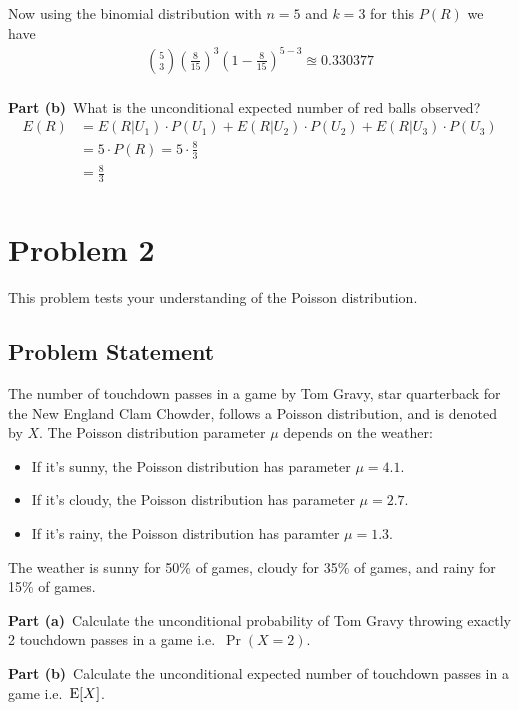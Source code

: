 \documentclass[12pt]{article}
\theoremstyle{definition}
\begin{document}
Now using the binomial distribution with $n=5$ and $k=3$ for this $P(R)$ we have
\begin{align*}
\binom{5}{3}\left(\frac{8}{15}\right)^3 \left(1-\frac{8}{15}\right)^{5-3} \approxeq 0.330377\\
\end{align*}

\newpage
\noindent
{\bf Part (b)}\ What is the unconditional expected number of red balls observed?
\begin{align*}
E(R) &= E(R|U_1) \cdot P(U_1) +  E(R|U_2) \cdot P(U_2) +  E(R|U_3) \cdot P(U_3)\\
&= 5\cdot P(R) = 5\cdot\frac{8}{3}\\
&= \frac{8}{3}\\
\end{align*}


\newpage
\section*{Problem 2}

This problem tests your understanding of the Poisson distribution.

\subsection*{Problem Statement}

The number of touchdown passes in a game by Tom Gravy, star quarterback for the New England Clam Chowder, follows a Poisson distribution, and is denoted by $X$. The Poisson distribution parameter $\mu$ depends on the weather:
\begin{itemize}
	\item If it's sunny, the Poisson distribution has parameter $\mu = 4.1$.
	\item If it's cloudy, the Poisson distribution has parameter $\mu = 2.7$.
	\item If it's rainy, the Poisson distribution has paramter $\mu = 1.3$.
\end{itemize}
The weather is sunny for 50\% of games, cloudy for 35\% of games, and rainy for 15\% of games.

\bigskip
\noindent
{\bf Part (a)}\ Calculate the unconditional probability of Tom Gravy throwing exactly 2 touchdown passes in a game i.e.\ $\Pr(X = 2)$.

\bigskip
\noindent
{\bf Part (b)}\ Calculate the unconditional expected number of touchdown passes in a game i.e.\  $\hbox{E}[ X ]$.
\end{document}
